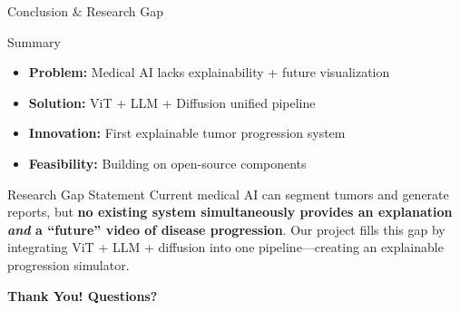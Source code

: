 \documentclass[aspectratio=169,xcolor=dvipsnames]{beamer}
\begin{document}
\begin{frame}{Conclusion \& Research Gap}
    \begin{block}{Summary}
        \small
        \begin{itemize}\setlength{\itemsep}{1pt}
            \item \textbf{Problem:} Medical AI lacks explainability + future visualization
            \item \textbf{Solution:} ViT + LLM + Diffusion unified pipeline
            \item \textbf{Innovation:} First explainable tumor progression system
            \item \textbf{Feasibility:} Building on open-source components
        \end{itemize}
    \end{block}
    
    \begin{alertblock}{Research Gap Statement}
        \small
        Current medical AI can segment tumors and generate reports, but \textbf{no existing system simultaneously provides an explanation \textit{and} a ``future'' video of disease progression}. Our project fills this gap by integrating ViT + LLM + diffusion into one pipeline---creating an explainable progression simulator.
    \end{alertblock}
    
    \vspace{0.3em}
    
    \centering
    \Large \textbf{Thank You! Questions?}
\end{frame}
\end{document}
